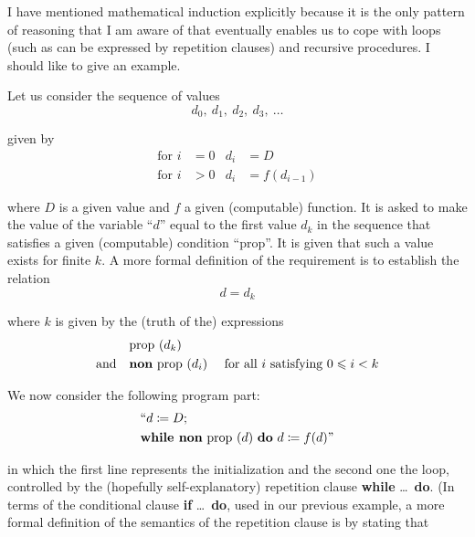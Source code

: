 I have mentioned mathematical induction explicitly because it is the only pattern of reasoning that I am aware of that eventually enables us to cope with loops (such as can be expressed by repetition clauses) and recursive procedures. I should like to give an example.

Let us consider the sequence of values
\begin{equation}
	\label{eq:induction-d}
	d_0,\ d_1,\ d_2,\ d_3,\ \dotso
\end{equation}

\noindent
given by
\begin{subequations}
\begin{align}
	\label{eq:induction-for-a}
	\text{for } i &= 0 & d_i &= D \\
	\label{eq:induction-for-b}
	\text{for } i &> 0 & d_i &= f(d_{i-1})
\end{align}
\end{subequations}

\noindent
where $D$ is a given value and $f$ a given (computable) function. It is asked to make the value of the variable ``$d$'' equal to the first value $d_k$ in the sequence that satisfies a given (computable) condition ``prop''. It is given that such a value exists for finite $k$. A more formal definition of the requirement is to establish the relation
\begin{equation}
	\label{eq:induction-dk}
	d=d_k
\end{equation}

\noindent
where $k$ is given by the (truth of the) expressions
\begin{eqnarray}
	\label{eq:prod-dk}
	&\text{prop } (d_k)& \\
	\label{eq:non-prop-i}
	\text{and}\quad &\text{\textbf{non} prop }(d_i) &\text{ for all } i \text{ satisfying } 0 \leqslant i < k
\end{eqnarray}

We now consider the following program part:
\begin{equation}
	\label{eq:program-while-non-prop}
	\begin{split}
		&\text{``}d \coloneq D;\\
		&\text{\textbf{while non} prop }(d) \text{ \textbf{do} } d \coloneq f(d)\text{''}
	\end{split}
\end{equation}

\noindent
in which the first line represents the initialization and the second one the loop, controlled by the (hopefully self-explanatory) repetition clause \textbf{while} \dots\ \textbf{do}. (In terms of the conditional clause \textbf{if} \dots\ \textbf{do}, used in our previous example, a more formal definition of the semantics of the repetition clause is by stating
that
\medskip


